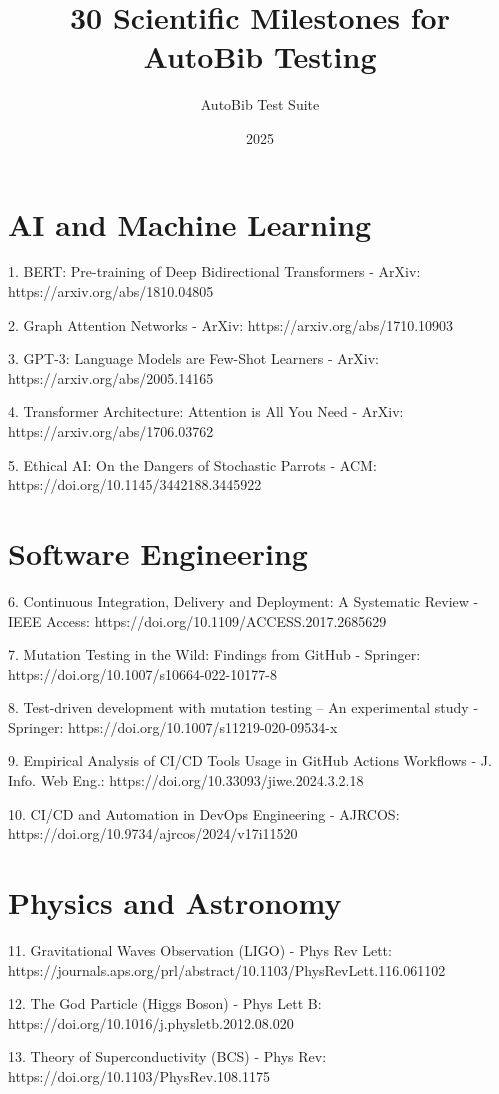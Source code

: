 \documentclass[12pt]{article}
\title{30 Scientific Milestones for AutoBib Testing}
\author{AutoBib Test Suite}
\date{2025}
\begin{document}
\maketitle
\onehalfspacing

\section{AI and Machine Learning}
1. BERT: Pre-training of Deep Bidirectional Transformers - ArXiv: https://arxiv.org/abs/1810.04805

2. Graph Attention Networks - ArXiv: https://arxiv.org/abs/1710.10903

3. GPT-3: Language Models are Few-Shot Learners - ArXiv: https://arxiv.org/abs/2005.14165

4. Transformer Architecture: Attention is All You Need - ArXiv: https://arxiv.org/abs/1706.03762

5. Ethical AI: On the Dangers of Stochastic Parrots - ACM: https://doi.org/10.1145/3442188.3445922

\section{Software Engineering}
6. Continuous Integration, Delivery and Deployment: A Systematic Review - IEEE Access: https://doi.org/10.1109/ACCESS.2017.2685629

7. Mutation Testing in the Wild: Findings from GitHub - Springer: https://doi.org/10.1007/s10664-022-10177-8

8. Test-driven development with mutation testing – An experimental study - Springer: https://doi.org/10.1007/s11219-020-09534-x

9. Empirical Analysis of CI/CD Tools Usage in GitHub Actions Workflows - J. Info. Web Eng.: https://doi.org/10.33093/jiwe.2024.3.2.18

10. CI/CD and Automation in DevOps Engineering - AJRCOS: https://doi.org/10.9734/ajrcos/2024/v17i11520

\section{Physics and Astronomy}
11. Gravitational Waves Observation (LIGO) - Phys Rev Lett: https://journals.aps.org/prl/abstract/10.1103/PhysRevLett.116.061102

12. The God Particle (Higgs Boson) - Phys Lett B: https://doi.org/10.1016/j.physletb.2012.08.020

13. Theory of Superconductivity (BCS) - Phys Rev: https://doi.org/10.1103/PhysRev.108.1175
\end{document}
